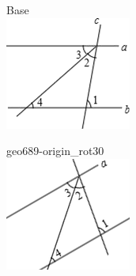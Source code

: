 \documentclass[12pt]{article}
\begin{document}
\begin{center}
\begin{minipage}{0.32\textwidth}\centering
Base\\
\includegraphics[width=0.95\linewidth]{out_rommath_origin/items/geo689-origin/assets/figure.png}
\end{minipage}
\hfill\begin{minipage}{0.32\textwidth}\centering
geo689-origin\_rot30\\
\includegraphics[width=0.95\linewidth]{out_rommath_origin/items/geo689-origin/assets/figure_rot30.png}

\end{minipage}
\end{center}
\end{document}
